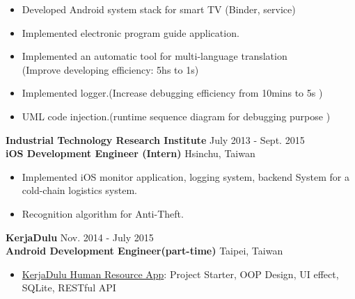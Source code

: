 \documentclass{res}
\begin{document}
\begin{resume}
				\begin{itemize}[leftmargin=*]
					\item Developed Android system stack for smart TV (Binder, service)	
					\vspace{-0.05in}
					\item Implemented electronic program guide application.
					\vspace{-0.05in}
					\item Implemented an automatic tool for multi-language translation \\(Improve developing efficiency: 5hs to 1s)
					\vspace{-0.05in}		
					\item Implemented logger.(Increase debugging efficiency from 10mins to 5s )
					\vspace{-0.05in}	
					\item UML code injection.(runtime sequence diagram for debugging purpose )
				\end{itemize}
				\vspace{-0.1in}
				{\bf Industrial Technology Research Institute } {\hfill July 2013 - Sept. 2015}\\	
				{\bf iOS Development Engineer (Intern)}                        {\hfill Hsinchu, Taiwan}

				\begin{itemize}[leftmargin=*]
					\item Implemented iOS monitor application, logging system, backend System for a cold-chain logistics system.
					\vspace{-0.05in} 
					\item Recognition algorithm for Anti-Theft.
					\vspace{-0.05in}
				\end{itemize}
				\vspace{-0.1in}

	 			{\bf KerjaDulu }                                {\hfill  Nov. 2014 - July 2015}\\
				{\bf Android Development Engineer(part-time)}			    	 {\hfill Taipei, Taiwan}
		
				\begin{itemize}[leftmargin=*]
					\item {\href{https://play.google.com/store/apps/details?id=com.kerjadulu.kerjadulu&hl=zh_TW}{KerjaDulu Human Resource App}}: Project Starter, OOP Design, UI effect, SQLite, RESTful API
				\end{itemize}
				\vspace{-0.1in}


\end{resume}
\end{document}
